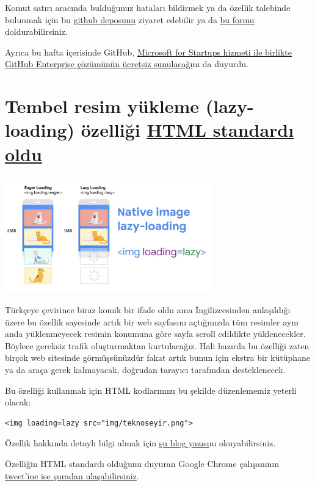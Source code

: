 \documentclass[11pt]{article}
\begin{document}
Komut satırı aracında bulduğunuz hataları bildirmek ya da özellik talebinde
bulunmak için bu \href{https://github.com/cli/cli}{github deposunu} ziyaret edebilir ya da \href{https://forms.gle/umxd3h31c7aMQFKG7}{bu formu}
doldurabilirsiniz.

Ayrıca bu hafta içerisinde GitHub, \href{https://github.blog/2020-02-13-github-enterprise-is-now-free-through-microsoft-for-startups/}{Microsoft for Startups hizmeti ile birlikte
GitHub Enterprise çözümünün ücretsiz sunulacağı}nı da duyurdu.
\section{Tembel resim yükleme (lazy-loading) özelliği \href{https://github.com/whatwg/html/pull/3752\#issuecomment-585202516}{HTML standardı oldu}}
\label{sec:org56093a9}
\begin{center}
\includegraphics[height=5cm]{gorseller/lazy-loading.png}
\end{center}

Türkçeye çevirince biraz komik bir ifade oldu ama İngilizcesinden anlaşıldığı
üzere bu özellik sayesinde artık bir web sayfasını açtığınızda tüm resimler
aynı anda yüklenmeyecek resimin konumuna göre sayfa scroll edildikte
yüklenecekler. Böylece gereksiz trafik oluşturmaktan kurtulacağız. Hali
hazırda bu özelliği zaten birçok web sitesinde görmüşsünüzdür fakat artık
bunun için ekstra bir kütüphane ya da araça gerek kalmayacak, doğrudan
tarayıcı tarafından desteklenecek.

Bu özelliği kullanmak için HTML kodlarımızı bu şekilde düzenlememiz yeterli
olacak:
\begin{verbatim}
<img loading=lazy src="img/teknoseyir.png">
\end{verbatim}

Özellik hakkında detaylı bilgi almak için \href{https://web.dev/native-lazy-loading/}{şu blog yazısı}nı okuyabilirsiniz.

Özelliğin HTML standardı olduğunu duyuran Google Chrome çalışanının \href{https://twitter.com/addyosmani/status/1227619409625174016}{tweet'ine
ise şuradan ulaşabilirsiniz}.
\end{document}
